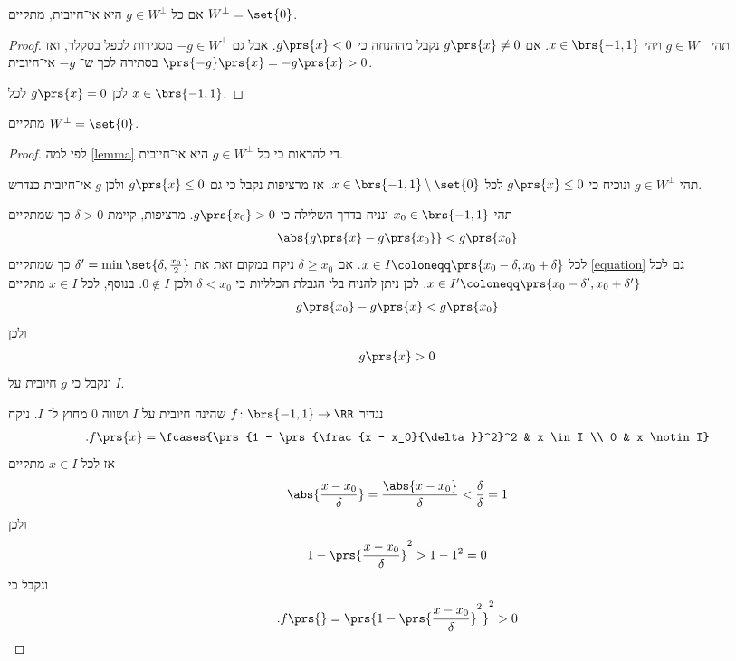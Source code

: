 \documentclass[a4paper,10pt,twoside,openany]{article}
\begin{document}
\begin{description}
\begin{lemma}\label{lemma}
אם כל
$g \in W^\perp$
היא אי־חיובית, מתקיים
$W^\perp = \set{0}$.
\end{lemma}

\begin{proof}
תהי
$g \in W^\perp$
ויהי
$x \in \brs{-1,1}$.
אם
$g\prs{x} \neq 0$
נקבל מההנחה כי
$g\prs{x} < 0$.
אבל גם
$-g \in W^\perp$
מסגירות לכפל בסקלר, ואז
$\prs{-g}\prs{x} = -g\prs{x} > 0$
בסתירה לכך ש־%
$-g$
אי־חיובית.

לכן
$g\prs{x} = 0$
לכל
$x \in \brs{-1, 1}$.
\end{proof}

\begin{proposition}
מתקיים
$W^\perp = \set{0}$.
\end{proposition}

\begin{proof}
לפי למה
\ref{lemma}
די להראות כי כל
$g \in W^\perp$
היא אי־חיובית.

תהי
$g \in W^\perp$
ונוכיח כי
$g\prs{x} \leq 0$
לכל
$x \in \brs{-1, 1} \setminus \set{0}$.
אז מרציפות נקבל כי גם
$g\prs{x} \leq 0$
ולכן
$g$
אי־חיובית כנדרש.

תהי
$x_0 \in \brs{-1, 1}$
ונניח בדרך השלילה כי
$g\prs{x_0} > 0$.
מרציפות, קיימת
$\delta > 0$
כך שמתקיים
\begin{align} \label{equation}
\abs{g\prs{x} - g\prs{x_0}} < g\prs{x_0}
\end{align}
לכל
$x \in I \coloneqq \prs{x_0 - \delta, x_0 + \delta}$.
אם
$\delta \geq x_0$
ניקח במקום זאת את
$\delta' = \min\set{\delta, \frac{x_0}{2}}$
כך שמתקיים
\ref{equation}
גם לכל
$x \in I' \coloneqq \prs{x_0 - \delta', x_0 + \delta'}$.
לכן ניתן להניח בלי הגבלת הכלליות כי
$\delta < x_0$
ולכן
$0 \notin I$.
בנוסף, לכל
$x \in I$
מתקיים
\begin{align*}
g\prs{x_0} - g\prs{x} < g\prs{x_0}
\end{align*}
ולכן
\begin{align*}
g\prs{x} > 0
\end{align*}
ונקבל כי
$g$
חיובית על
$I$.

נגדיר
$f \colon \brs{-1, 1} \to \RR$
שהינה חיובית על
$I$
ושווה
$0$
מחוץ ל־%
$I$.
ניקח
\begin{align*}
\text{.} f\prs{x} = \fcases{\prs{1 - \prs{\frac{x - x_0}{\delta}}^2}^2 & x \in I \\ 0 & x \notin I}
\end{align*}
אז לכל
$x \in I$
מתקיים
\begin{align*}
\abs{\frac{x - x_0}{\delta}} = \frac{\abs{x - x_0}}{\delta} < \frac{\delta}{\delta} = 1
\end{align*}
ולכן
\begin{align*}
1 - \prs{\frac{x - x_0}{\delta}}^2 > 1 - 1^2 = 0
\end{align*}
ונקבל כי
\[\text{.} f\prs{} = \prs{1 - \prs{\frac{x - x_0}{\delta}}^2}^2 > 0\]


\end{proof}
\end{description}
\end{document}
